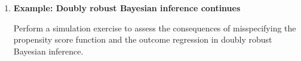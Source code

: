 \begin{enumerate}
	\item \textbf{Example: Doubly robust Bayesian inference continues}
	
	Perform a simulation exercise to assess the consequences of misspecifying the propensity score function and the outcome regression in doubly robust Bayesian inference.	
\end{enumerate}
